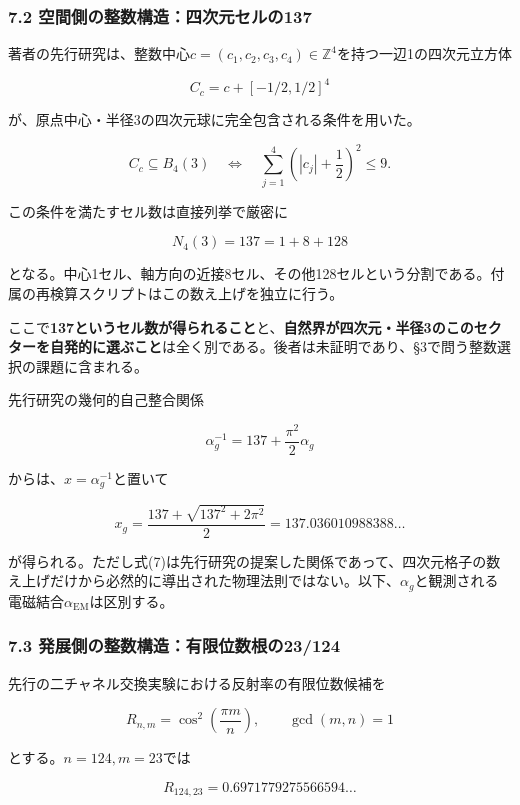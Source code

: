 \documentclass[
  a4paper,
]{ltjsarticle}
\begin{document}
\subsubsection{7.2
空間側の整数構造：四次元セルの137}\label{ux7a7aux9593ux5074ux306eux6574ux6570ux69cbux9020ux56dbux6b21ux5143ux30bbux30ebux306e137}

著者の先行研究は、整数中心\(c=(c_1,c_2,c_3,c_4)\in\mathbb Z^4\)を持つ一辺1の四次元立方体

\[
C_c=c+[-1/2,1/2]^4
\]

が、原点中心・半径3の四次元球に完全包含される条件を用いた。

\[
C_c\subseteq B_4(3)
\quad\Longleftrightarrow\quad
\sum_{j=1}^4\left(|c_j|+\frac12\right)^2\le9.
\tag{5}
\]

この条件を満たすセル数は直接列挙で厳密に

\[
\boxed{N_4(3)=137=1+8+128}
\tag{6}
\]

となる。中心1セル、軸方向の近接8セル、その他128セルという分割である。付属の再検算スクリプトはこの数え上げを独立に行う。

ここで\textbf{137というセル数が得られること}と、\textbf{自然界が四次元・半径3のこのセクターを自発的に選ぶこと}は全く別である。後者は未証明であり、§3で問う整数選択の課題に含まれる。

先行研究の幾何的自己整合関係

\[
\alpha_g^{-1}=137+\frac{\pi^2}{2}\alpha_g
\tag{7}
\]

からは、\(x=\alpha_g^{-1}\)と置いて

\[
x_g=\frac{137+\sqrt{137^2+2\pi^2}}{2}
=137.036010988388\ldots
\tag{8}
\]

が得られる。ただし式(7)は先行研究の提案した関係であって、四次元格子の数え上げだけから必然的に導出された物理法則ではない。以下、\(\alpha_g\)と観測される電磁結合\(\alpha_{\mathrm{EM}}\)は区別する。

\subsubsection{7.3
発展側の整数構造：有限位数根の23/124}\label{ux767aux5c55ux5074ux306eux6574ux6570ux69cbux9020ux6709ux9650ux4f4dux6570ux6839ux306e23124}

先行の二チャネル交換実験における反射率の有限位数候補を

\[
R_{n,m}=\cos^2\left(\frac{\pi m}{n}\right),
\qquad \gcd(m,n)=1
\tag{9}
\]

とする。\(n=124,m=23\)では

\[
R_{124,23}=0.6971779275566594\ldots
\tag{10}
\]
\end{document}
